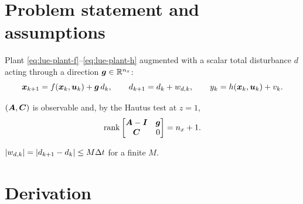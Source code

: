 \section{Problem statement and assumptions}
Plant \eqref{eq:lue-plant-f}--\eqref{eq:lue-plant-h} augmented with a scalar total disturbance
$d$ acting through a direction $\bm{g}\in\mathbb{R}^{n_x}$:
\begin{equation}
\bm{x}_{k+1} = f(\bm{x}_k,\bm{u}_k) + \bm{g}\,d_k , \qquad
d_{k+1} = d_k + w_{d,k} , \qquad
y_k = h(\bm{x}_k,\bm{u}_k) + v_k .
\label{eq:eso-plant}
\end{equation}
\begin{assumption}\label{as:eso-obs}
$(\bm{A},\bm{C})$ is observable and, by the Hautus test at $z=1$,
\begin{equation}
\operatorname{rank}\begin{bmatrix}\bm{A}-\bm{I} & \bm{g}\\ \bm{C} & 0\end{bmatrix} = n_x+1 .
\label{eq:eso-hautus}
\end{equation}
\end{assumption}
\begin{assumption}\label{as:eso-slow}
$|w_{d,k}| = |d_{k+1}-d_k| \le M\Delta t$ for a finite $M$.
\end{assumption}

\section{Derivation}

